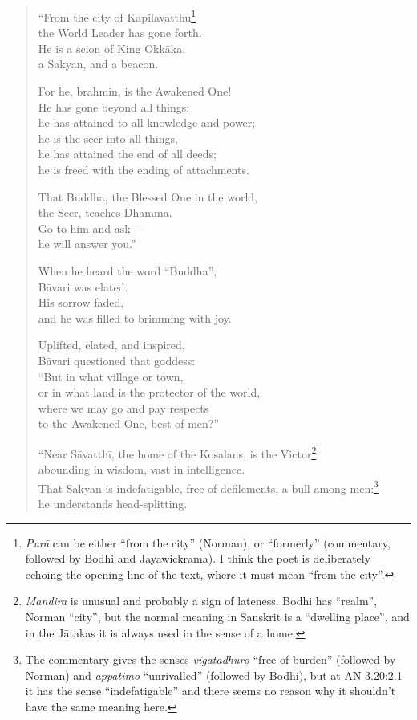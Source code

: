 \documentclass[12pt,openany]{book}%
\begin{document}
\begin{verse}
“From the city of Kapilavatthu\footnote{\textit{\textsanskrit{Purā}} can be either “from the city” (Norman), or “formerly” (commentary, followed by Bodhi and Jayawickrama). I think the poet is deliberately echoing the opening line of the text, where it must mean “from the city”. } \\
the World Leader has gone forth. \\
He is a scion of King \textsanskrit{Okkāka}, \\
a Sakyan, and a beacon. 

For he, brahmin, is the Awakened One! \\
He has gone beyond all things; \\
he has attained to all knowledge and power; \\
he is the seer into all things, \\
he has attained the end of all deeds; \\
he is freed with the ending of attachments. 

That Buddha, the Blessed One in the world, \\
the Seer, teaches Dhamma. \\
Go to him and ask—\\
he will answer you.” 

When he heard the word “Buddha”, \\
\textsanskrit{Bāvari} was elated. \\
His sorrow faded, \\
and he was filled to brimming with joy. 

Uplifted, elated, and inspired, \\
\textsanskrit{Bāvari} questioned that goddess: \\
“But in what village or town, \\
or in what land is the protector of the world, \\
where we may go and pay respects \\
to the Awakened One, best of men?” 

“Near \textsanskrit{Sāvatthī}, the home of the Kosalans, is the Victor\footnote{\textit{Mandira} is unusual and probably a sign of lateness. Bodhi has “realm”, Norman “city”, but the normal meaning in Sanskrit is a “dwelling place”, and in the \textsanskrit{Jātakas} it is always used in the sense of a home. } \\
abounding in wisdom, vast in intelligence. \\
That Sakyan is indefatigable, free of defilements, a bull among men:\footnote{The commentary gives the senses \textit{vigatadhuro} “free of burden” (followed by Norman) and \textit{\textsanskrit{appaṭimo}} “unrivalled” (followed by Bodhi), but at AN 3.20:2.1 it has the sense “indefatigable” and there seems no reason why it shouldn’t have the same meaning here. } \\
he understands head-splitting. 


\end{verse}
\end{document}
